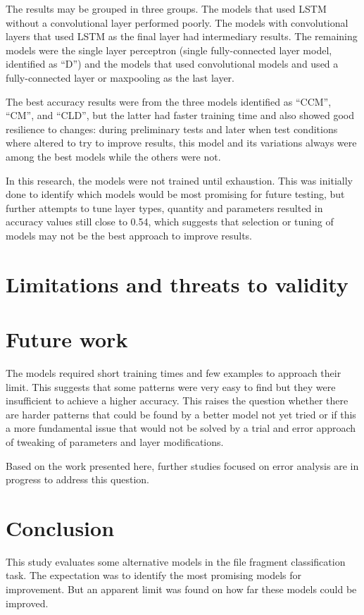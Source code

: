The results may be grouped in three groups. The models that used LSTM without a convolutional layer performed poorly. The models with convolutional layers that used LSTM as the final layer had intermediary results. The remaining models were the single layer perceptron (single fully-connected layer model, identified as ``D'') and the models that used convolutional models and used a fully-connected layer or maxpooling as the last layer.

The best accuracy results were from the three models identified as ``CCM'', ``CM'', and ``CLD'', but the latter had faster training time and also showed good resilience to changes: during preliminary tests and later when test conditions where altered to try to improve results, this model and its variations always were among the best models while the others were not.

In this research, the models were not trained until exhaustion. This was initially done to identify which models would be most promising for future testing, but further attempts to tune layer types, quantity and parameters resulted in accuracy values still close to 0.54, which suggests that selection or tuning of models may not be the best approach to improve results.

\section{Limitations and threats to validity}

\section{Future work}

The models required short training times and few examples to approach their limit.
This suggests that some patterns were very easy to find but they were insufficient to achieve a higher accuracy.
This raises the question whether there are harder patterns that could be found by a better model not yet tried or if this a more fundamental issue that would not be solved by a trial and error approach of tweaking of parameters and layer modifications.

Based on the work presented here, further studies focused on error analysis are in progress to address this question.

\section{Conclusion}
This study evaluates some alternative models in the file fragment classification task. The expectation was to identify the most promising models for improvement. But an apparent limit was found on how far these models could be improved.


